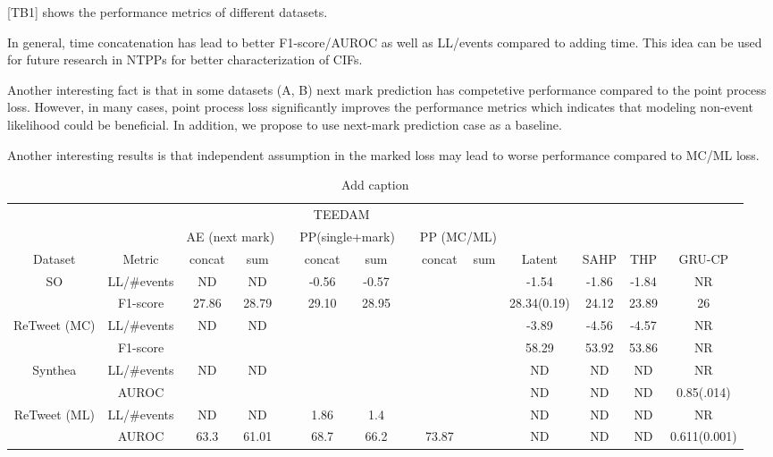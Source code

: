 \documentclass[journal,twoside,web]{ieeecolor}
\begin{document}
[TB1] shows the performance metrics of different datasets. 

In general, time concatenation has lead to better F1-score/AUROC as well as LL/events compared to adding time. This idea can be used for future research in NTPPs for better characterization of CIFs.

Another interesting fact is that in some datasets (A, B) next mark prediction has competetive performance compared to the point process loss. However, in many cases, point process loss significantly improves the performance metrics which indicates that modeling non-event likelihood could be beneficial. In addition, we propose to use next-mark prediction case as a baseline.

Another interesting results is that independent assumption in the marked loss may lead to worse performance compared to MC/ML loss.


\begin{table}[htbp]
  \centering
  \caption{Add caption}
    \begin{tabular}{cccccccccccccc}
    \toprule
          &       & \multicolumn{8}{c}{TEEDAM}                                    &       &       &       &  \\
\cmidrule{3-10}          &       & \multicolumn{2}{c}{AE (next mark)} &       & \multicolumn{2}{c}{PP(single+mark)} &       & \multicolumn{2}{c}{PP (MC/ML)} &       &       &       &  \\
\cmidrule{3-4}\cmidrule{6-7}\cmidrule{9-10}    Dataset & Metric & concat & sum   &       & concat & sum   &       & concat & sum   & Latent & SAHP  & THP   & GRU-CP \\
    \midrule
    \multirow{2}[2]{*}{SO} & LL/\#events & ND    & ND    &       & -0.56 & -0.57 &       &       &       & -1.54 & -1.86 & -1.84 & NR \\
          & F1-score & 27.86 & 28.79 &       & 29.10 & 28.95 &       &       &       & 28.34(0.19) & 24.12 & 23.89 & 26 \\
    \midrule
    \multirow{2}[2]{*}{ReTweet (MC)} & LL/\#events & ND    & ND    &       &       &       &       &       &       & -3.89 & -4.56 & -4.57 & NR \\
          & F1-score &       &       &       &       &       &       &       &       & 58.29 & 53.92 & 53.86 & NR \\
    \midrule
    \multirow{2}[2]{*}{Synthea} & LL/\#events & ND    & ND    &       &       &       &       &       &       & ND    & ND    & ND    & NR \\
          & AUROC &       &       &       &       &       &       &       &       & ND    & ND    & ND    & 0.85(.014) \\
    \midrule
    \multirow{2}[2]{*}{ReTweet (ML)} & LL/\#events & ND    & ND    &       & 1.86  & 1.4   &       &       &       & ND    & ND    & ND    & NR \\
          & AUROC & 63.3  & 61.01 &       & 68.7  & 66.2  &       & 73.87 &       & ND    & ND    & ND    & 0.611(0.001) \\
    \bottomrule
    \end{tabular}%
  \label{tab:addlabel}%
\end{table}%
\end{document}

